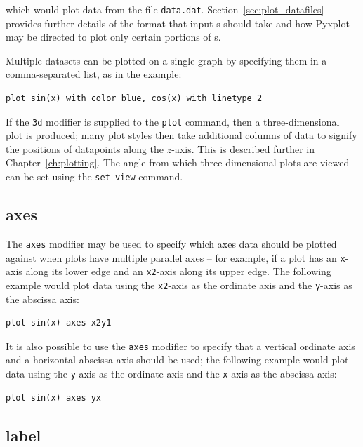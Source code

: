 \noindent which would plot data from the file {\tt data.dat}.
Section~\ref{sec:plot_datafiles} provides further details of the format that
input \datafile s should take and how Pyxplot may be directed to plot only
certain portions of \datafile s.

Multiple datasets can be plotted on a single graph by specifying them in a
comma-separated list, as in the example:

\begin{verbatim}
plot sin(x) with color blue, cos(x) with linetype 2
\end{verbatim}

If the {\tt 3d} modifier is supplied to the {\tt plot} command, then a
three-dimensional plot is produced; many plot styles then take additional
columns of data to signify the positions of datapoints along the $z$-axis. This
is described further in Chapter~\ref{ch:plotting}. The angle from which
three-dimensional plots are viewed can be set using the {\tt set view} command.


\subsection{axes}

The {\tt axes} modifier may be used to specify which axes data should be
plotted against when plots have multiple parallel axes -- for example, if a
plot has an {\tt x}-axis along its lower edge and an {\tt x2}-axis along its
upper edge. The following example would plot data using the {\tt x2}-axis as
the ordinate axis and the {\tt y}-axis as the abscissa axis:

\begin{verbatim}
plot sin(x) axes x2y1
\end{verbatim}

\noindent It is also possible to use the {\tt axes} modifier to specify that a
vertical ordinate axis and a horizontal abscissa axis should be used; the
following example would plot data using the {\tt y}-axis as the ordinate axis
and the {\tt x}-axis as the abscissa axis:

\begin{verbatim}
plot sin(x) axes yx
\end{verbatim}


\subsection{label}

